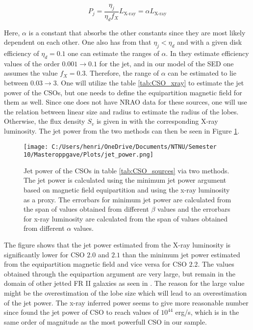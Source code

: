 \begin{equation}
    \label{eq:jet_power}
    P_j = \frac{\eta_j}{\eta_d f_X} L_{\text{X-ray}} = \alpha L_{\text{X-ray}}
\end{equation}

Here, $\alpha$ is a constant that absorbs the other constants since they are most likely dependent on each other. One also has from \cite{Broderick_2015} that $\eta_j < \eta_d$ and with a given disk efficiency of $\eta_d = 0.1$ one can estimate the ranges of $\alpha$. In \cite{W_jtowicz_2020} they estimate efficiency values of the order $0.001 \rightarrow 0.1$ for the jet, and in our model of the SED one assumes the value $f_X = 0.3$. Therefore, the range of $\alpha$ can be estimated to lie between $0.03 \rightarrow 3$. One will utilize the table \ref{tab:CSO_xray} to estimate the jet power of the CSOs, but one needs to define the equipartition magnetic field for them as well. Since one does not have NRAO data for these sources, one will use the relation between linear size and radius to estimate the radius of the lobes. Otherwise, the flux density $S_v$ is given in \cite{W_jtowicz_2020} with the corresponding X-ray luminosity. The jet power from the two methods can then be seen in Figure \ref{fig:jet_power}.


\begin{figure}
    \centering
    \texttt{[image: C:/Users/henri/OneDrive/Documents/NTNU/Semester 10/Masteroppgave/Plots/jet\_power.png]}
    \caption{Jet power of the CSOs in table \ref{tab:CSO_sources} via two methods. The jet power is calculated using the minimum jet power argument based on magnetic field equipartition and using the x-ray luminosity as a proxy. The errorbars for minimum jet power are calculated from the span of values obtained from different $\beta$ values and the errorbars for x-ray luminosity are calculated from the span of values obtained from different $\alpha$ values.} 
    \label{fig:jet_power}
\end{figure}

The figure shows that the jet power estimated from the X-ray luminosity is significantly lower for CSO $2.0$ and $2.1$ than the minimum jet power estimated from the equipartition magnetic field and vice versa for CSO $2.2$. The values obtained through the equipartion argument are very large, but remain in the domain of other jetted FR II galaxies as seen in \cite{Godfrey2013}. The reason for the large value might be the overestimation of the lobe size which will lead to an overestimation of the jet power. The x-ray inferred power seems to give more reasonable number since \cite{readhead2023compact} found the jet power of CSO to reach values of $10^{44}$ erg/s, which is in the same order of magnitude as the most powerfull CSO in our sample.


